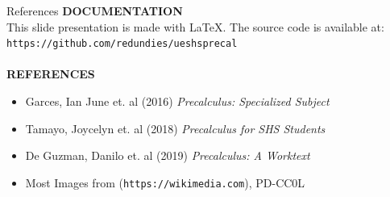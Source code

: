 \documentclass[14pt,aspectratio=169]{beamer}
\begin{document}
\begin{frame}{References}
\textbf{DOCUMENTATION}\\
 This slide presentation is made with {\textrm \LaTeX}.
 The source code is available at:
 \texttt{https://github.com/redundies/ueshsprecal}\\~\\

 \textbf{REFERENCES}
 \begin{itemize}
  \item Garces, Ian June et. al (2016) \textit{Precalculus: Specialized Subject}
  \item Tamayo, Joycelyn et. al (2018) \textit{Precalculus for SHS Students}
  \item De Guzman, Danilo et. al (2019) \textit{Precalculus: A Worktext}
  \item Most Images from (\texttt{https://wikimedia.com}), {\sc PD-CC0L}
 \end{itemize}


\end{frame}
\end{document}
